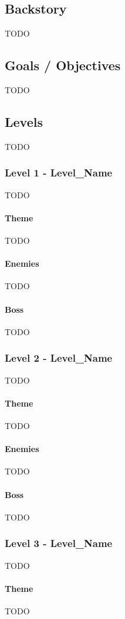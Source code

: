 \subsection{Backstory}
TODO

\subsection{Goals / Objectives}
TODO

\subsection{Levels}
TODO

\subsubsection{Level 1 - Level\_Name}
TODO
\paragraph{Theme}
TODO
\paragraph{Enemies}
TODO
\paragraph{Boss}
TODO

\subsubsection{Level 2 - Level\_Name}
TODO
\paragraph{Theme}
TODO
\paragraph{Enemies}
TODO
\paragraph{Boss}
TODO

\subsubsection{Level 3 - Level\_Name}
TODO
\paragraph{Theme}
TODO

